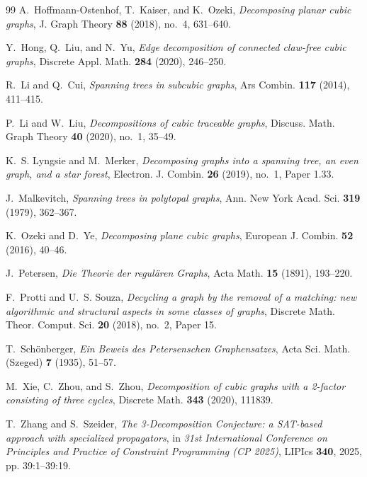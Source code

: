 \documentclass[a4paper,11pt]{article}
\numberwithin{equation}{section}
\begin{document}
\begin{thebibliography}{99}
A.~Hoffmann-Ostenhof, T.~Kaiser, and K.~Ozeki,
\emph{Decomposing planar cubic graphs},
J. Graph Theory \textbf{88} (2018), no.~4, 631--640.

Y.~Hong, Q.~Liu, and N.~Yu,
\emph{Edge decomposition of connected claw-free cubic graphs},
Discrete Appl. Math. \textbf{284} (2020), 246--250.

R.~Li and Q.~Cui,
\emph{Spanning trees in subcubic graphs},
Ars Combin. \textbf{117} (2014), 411--415.

P.~Li and W.~Liu,
\emph{Decompositions of cubic traceable graphs},
Discuss. Math. Graph Theory \textbf{40} (2020), no.~1, 35--49.

K.~S. Lyngsie and M.~Merker,
\emph{Decomposing graphs into a spanning tree, an even graph, and a star
forest},
Electron. J. Combin. \textbf{26} (2019), no.~1, Paper 1.33.

J.~Malkevitch,
\emph{Spanning trees in polytopal graphs},
Ann. New York Acad. Sci. \textbf{319} (1979), 362--367.

K.~Ozeki and D.~Ye,
\emph{Decomposing plane cubic graphs},
European J. Combin. \textbf{52} (2016), 40--46.

J.~Petersen,
\emph{Die Theorie der regul\"aren Graphs},
Acta Math. \textbf{15} (1891), 193--220.

F.~Protti and U.~S. Souza,
\emph{Decycling a graph by the removal of a matching: new algorithmic and
structural aspects in some classes of graphs},
Discrete Math. Theor. Comput. Sci. \textbf{20} (2018), no.~2, Paper 15.

T.~Sch\"onberger,
\emph{Ein Beweis des Petersenschen Graphensatzes},
Acta Sci. Math. (Szeged) \textbf{7} (1935), 51--57.

M.~Xie, C.~Zhou, and S.~Zhou,
\emph{Decomposition of cubic graphs with a 2-factor consisting of three cycles},
Discrete Math. \textbf{343} (2020), 111839.

T.~Zhang and S.~Szeider,
\emph{The 3-Decomposition Conjecture: a SAT-based approach with specialized
propagators},
in \emph{31st International Conference on Principles and Practice of Constraint
Programming (CP 2025)}, LIPIcs \textbf{340}, 2025, pp. 39:1--39:19.

\end{thebibliography}
\end{document}
